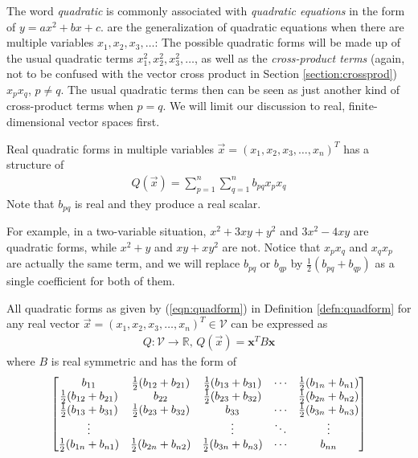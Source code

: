 The word \textit{quadratic} is commonly associated with \textit{quadratic equations} in the form of $y = ax^2 + bx + c$.  are the generalization of quadratic equations when there are multiple variables $x_1, x_2, x_3, \ldots$: The possible quadratic forms will be made up of the usual quadratic terms $x_1^2, x_2^2, x_3^2, \ldots$, as well as the \textit{cross-product terms} (again, not to be confused with the vector cross product in Section \ref{section:crossprod}) $x_px_q$, $p \neq q$. The usual quadratic terms then can be seen as just another kind of cross-product terms when $p = q$. We will limit our discussion to real, finite-dimensional vector spaces first.
\begin{defn}
\label{defn:quadform}
Real quadratic forms in multiple variables $\vec{x} = (x_1, x_2, x_3, \ldots, x_n)^T$ has a structure of
\begin{align}
Q(\vec{x}) = \sum_{p=1}^{n}\sum_{q=1}^{n} b_{pq} x_px_q \label{eqn:quadform}
\end{align}
Note that $b_{pq}$ is real and they produce a real scalar.
\end{defn}
For example, in a two-variable situation, $x^2 + 3xy + y^2$ and $3x^2 - 4xy$ are quadratic forms, while $x^2 + y$ and $xy + xy^2$ are not. Notice that $x_px_q$ and $x_qx_p$ are actually the same term, and we will replace $b_{pq}$ or $b_{qp}$ by $\frac{1}{2}(b_{pq} + b_{qp})$ as a single coefficient for both of them. 
\begin{proper}
\label{proper:quadformmatrix}
All quadratic forms as given by (\ref{eqn:quadform}) in Definition \ref{defn:quadform} for any real vector $\vec{x} = (x_1, x_2, x_3, \ldots, x_n)^T \in \mathcal{V}$ can be expressed as
\begin{align}
Q: \mathcal{V} \to \mathbb{R},\, Q(\vec{x}) = \textbf{x}^TB\textbf{x}
\end{align}
where $B$ is real symmetric and has the form of
\begin{align}
\left[\begin{array}{@{}ccccc@{}}
b_{11} & \frac{1}{2}(b_{12} + b_{21}) & \frac{1}{2}(b_{13} + b_{31}) & \cdots & \frac{1}{2}(b_{1n} + b_{n1}) \\
\frac{1}{2}(b_{12} + b_{21}) & b_{22} & \frac{1}{2}(b_{23} + b_{32}) & & \frac{1}{2}(b_{2n} + b_{n2}) \\
\frac{1}{2}(b_{13} + b_{31}) & \frac{1}{2}(b_{23} + b_{32}) & b_{33} & \cdots & \frac{1}{2}(b_{3n} + b_{n3})\\
\vdots &  & \vdots & \ddots & \vdots \\
\frac{1}{2}(b_{1n} + b_{n1}) & \frac{1}{2}(b_{2n} + b_{n2}) & \frac{1}{2}(b_{3n} + b_{n3}) & \cdots & b_{nn}
\end{array}\right]
\end{align}
\end{proper}
